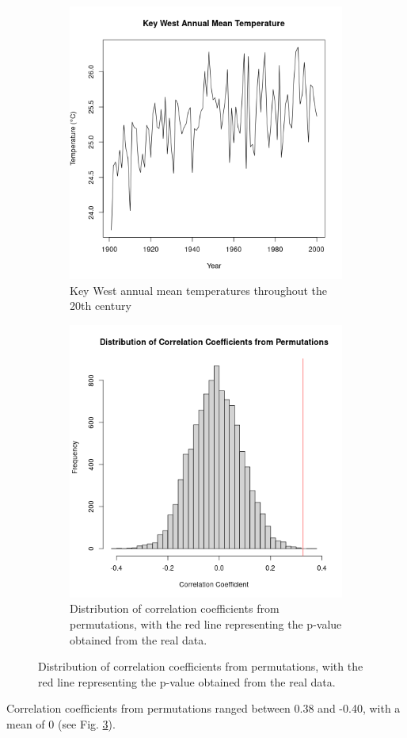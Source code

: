 \documentclass[12pt,a4paper]{article}
\begin{document}
\begin{figure}[h]
\centering
\begin{subfigure}{0.45\textwidth}
    \includegraphics[width=\textwidth]{../data/02_time.png}
    \caption{Key West annual mean temperatures throughout the 20th century}
    \label{fig:time}
\end{subfigure}
\hfill
\begin{subfigure}{0.45\textwidth}
    \includegraphics[width=\textwidth]{../data/02_corr.png}
    \caption{Distribution of correlation coefficients from permutations, with the red line representing the p-value obtained from the real data.}
    \label{fig:corr}
\end{subfigure}
\end{figure}

Correlation coefficients from permutations ranged between 0.38 and -0.40, with a mean of 0 (see Fig. \ref{fig:corr}).
\end{document}
